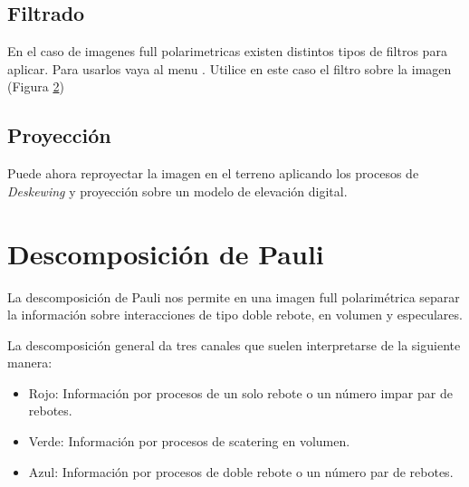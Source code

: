 \begin{figure}[h!]
    \centering
    \hfill
    \caption{}
    \label{fig:t3}
\end{figure}

\subsection{Filtrado}

En el caso de imagenes full polarimetricas existen distintos tipos de filtros para aplicar. Para usarlos vaya al menu . Utilice en este caso el filtro  sobre la imagen  (Figura \ref{fig:plee})

\begin{figure}[h!]
    \centering
    \hfill
    \caption{}
    \label{fig:plee}
\end{figure}

\subsection{Proyección}

Puede ahora reproyectar la imagen en el terreno aplicando los procesos de \emph{Deskewing} y proyección sobre un modelo de elevación digital.

\section{Descomposición de Pauli}

La descomposición de Pauli nos permite en una imagen full polarimétrica separar la información sobre interacciones de tipo doble rebote, en volumen y especulares.

La descomposición general da tres canales que suelen interpretarse de la siguiente manera:

\begin{itemize}
    \item Rojo: Información por procesos de un solo rebote o un número impar par de rebotes.
    \item Verde: Información por procesos de scatering en volumen.
    \item Azul: Información por procesos de doble rebote o un número par de rebotes.
\end{itemize}

